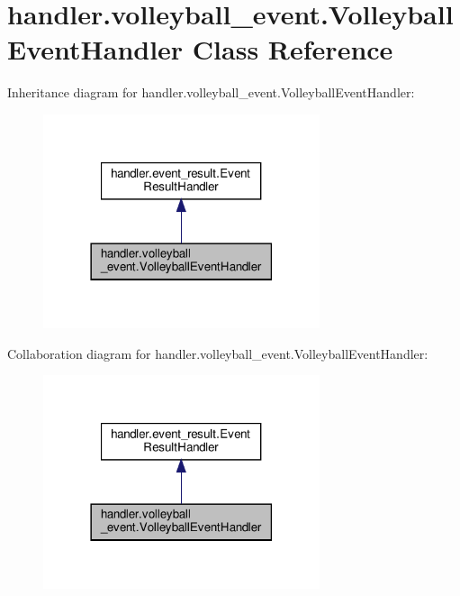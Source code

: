 \hypertarget{classhandler_1_1volleyball__event_1_1_volleyball_event_handler}{}\section{handler.\+volleyball\+\_\+event.\+Volleyball\+Event\+Handler Class Reference}
\label{classhandler_1_1volleyball__event_1_1_volleyball_event_handler}


Inheritance diagram for handler.\+volleyball\+\_\+event.\+Volleyball\+Event\+Handler\+:\nopagebreak
\begin{figure}[H]
\begin{center}
\leavevmode
\includegraphics[width=230pt]{classhandler_1_1volleyball__event_1_1_volleyball_event_handler__inherit__graph}
\end{center}
\end{figure}


Collaboration diagram for handler.\+volleyball\+\_\+event.\+Volleyball\+Event\+Handler\+:\nopagebreak
\begin{figure}[H]
\begin{center}
\leavevmode
\includegraphics[width=230pt]{classhandler_1_1volleyball__event_1_1_volleyball_event_handler__coll__graph}
\end{center}
\end{figure}
